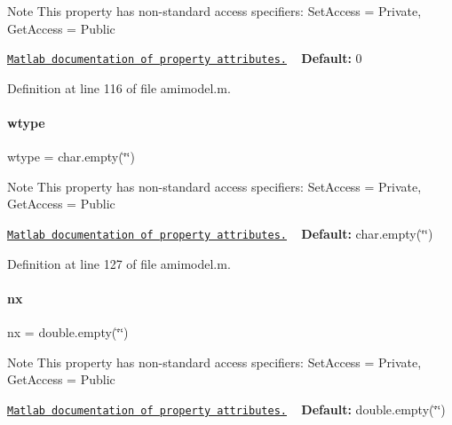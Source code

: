\begin{DoxyNote}{Note}
This property has non-\/standard access specifiers\+: {\ttfamily Set\+Access = Private, Get\+Access = Public} 

\href{http://www.mathworks.com/help/matlab/matlab_oop/property-attributes.html}{\tt Matlab documentation of property attributes.} ~\newline
{\bfseries Default\+:} 0 
\end{DoxyNote}


Definition at line 116 of file amimodel.\+m.

\mbox{\label{classamimodel_a5376250224ce32fb558d88aa0b5a93ff}} 
\paragraph{\texorpdfstring{wtype}{wtype}}
{\footnotesize\ttfamily wtype = char.\+empty(\char`\"{}\char`\"{})}

\begin{DoxyNote}{Note}
This property has non-\/standard access specifiers\+: {\ttfamily Set\+Access = Private, Get\+Access = Public} 

\href{http://www.mathworks.com/help/matlab/matlab_oop/property-attributes.html}{\tt Matlab documentation of property attributes.} ~\newline
{\bfseries Default\+:} char.\+empty(\char`\"{}\char`\"{}) 
\end{DoxyNote}


Definition at line 127 of file amimodel.\+m.

\mbox{\label{classamimodel_a84e4236f07668a770c27567f1f9615ff}} 
\paragraph{\texorpdfstring{nx}{nx}}
{\footnotesize\ttfamily nx = double.\+empty(\char`\"{}\char`\"{})}

\begin{DoxyNote}{Note}
This property has non-\/standard access specifiers\+: {\ttfamily Set\+Access = Private, Get\+Access = Public} 

\href{http://www.mathworks.com/help/matlab/matlab_oop/property-attributes.html}{\tt Matlab documentation of property attributes.} ~\newline
{\bfseries Default\+:} double.\+empty(\char`\"{}\char`\"{}) 
\end{DoxyNote}


